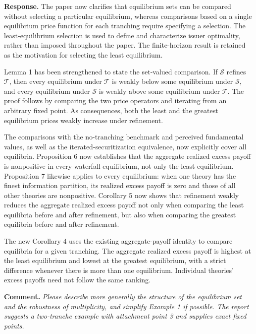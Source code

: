 \documentclass[11pt]{article}
\newcommand{\commenttext}[1]{\par\noindent\textbf{Comment.} \textit{#1}\par}
\newcommand{\response}[1]{\par\noindent\textbf{Response.} #1\par}
\begin{document}
\response{The paper now clarifies that equilibrium sets can be compared without selecting a particular equilibrium, whereas comparisons based on a single equilibrium price function for each tranching require specifying a selection. The least-equilibrium selection is used to define and characterize issuer optimality, rather than imposed throughout the paper. The finite-horizon result is retained as the motivation for selecting the least equilibrium.

Lemma 1 has been strengthened to state the set-valued comparison. If $\mathcal S$ refines $\mathcal T$, then every equilibrium under $\mathcal T$ is weakly below some equilibrium under $\mathcal S$, and every equilibrium under $\mathcal S$ is weakly above some equilibrium under $\mathcal T$. The proof follows by comparing the two price operators and iterating from an arbitrary fixed point. As consequences, both the least and the greatest equilibrium prices weakly increase under refinement.

The comparisons with the no-tranching benchmark and perceived fundamental values, as well as the iterated-securitization equivalence, now explicitly cover all equilibria. Proposition 6 now establishes that the aggregate realized excess payoff is nonpositive in every waterfall equilibrium, not only the least equilibrium. Proposition 7 likewise applies to every equilibrium: when one theory has the finest information partition, its realized excess payoff is zero and those of all other theories are nonpositive. Corollary 5 now shows that refinement weakly reduces the aggregate realized excess payoff not only when comparing the least equilibria before and after refinement, but also when comparing the greatest equilibria before and after refinement.

The new Corollary 4 uses the existing aggregate-payoff identity to compare equilibria for a given tranching. The aggregate realized excess payoff is highest at the least equilibrium and lowest at the greatest equilibrium, with a strict difference whenever there is more than one equilibrium. Individual theories' excess payoffs need not follow the same ranking.}

\commenttext{Please describe more generally the structure of the equilibrium set and the robustness of multiplicity, and simplify Example 1 if possible. The report suggests a two-tranche example with attachment point 3 and supplies exact fixed points.}
\end{document}
